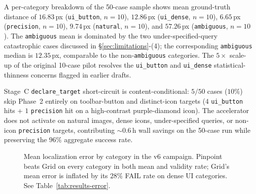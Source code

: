 \documentclass[sigconf,nonacm]{acmart}
\begin{document}

A per-category breakdown of the 50-case sample shows mean
ground-truth distance of $16.83$\,px (\texttt{ui\_button},
$n{=}10$), $12.86$\,px (\texttt{ui\_dense}, $n{=}10$),
$6.65$\,px (\texttt{precision}, $n{=}10$), $9.74$\,px
(\texttt{natural}, $n{=}10$), and $57.26$\,px
(\texttt{ambiguous}, $n{=}10$).  The \texttt{ambiguous} mean is
dominated by the two under-specified-query catastrophic cases
discussed in §\ref{sec:limitations}-(4); the corresponding
\texttt{ambiguous} median is $12.35$\,px, comparable to the
non-\texttt{ambiguous} categories.  The $5\times$ scale-up of
the original 10-case pilot resolves the
\texttt{ui\_button} and \texttt{ui\_dense} statistical-thinness
concerns flagged in earlier drafts.

Stage~C \texttt{declare\_target} short-circuit is
content-conditional: $5/50$ cases ($10\%$) skip Phase~2 entirely
on toolbar-button and distinct-icon targets ($4$ \texttt{ui\_button}
hits + $1$ \texttt{precision} hit on a high-contrast
purple-diamond icon).  The accelerator does not activate on
natural images, dense icons, under-specified queries, or
non-icon \texttt{precision} targets, contributing $\sim$$0.6$\,h
wall savings on the 50-case run while preserving the $96\%$
aggregate success rate.


\begin{figure}[t]
  \centering
  
  \caption{Mean localization error by category in the v6 campaign.
    Pinpoint beats Grid on every category in both mean and validity
    rate; Grid's mean error is inflated by its $28\%$ FAIL rate on
    dense UI categories.  See Table~\ref{tab:results-error}.
  }
  \label{fig:accuracy}
\end{figure}
\end{document}
